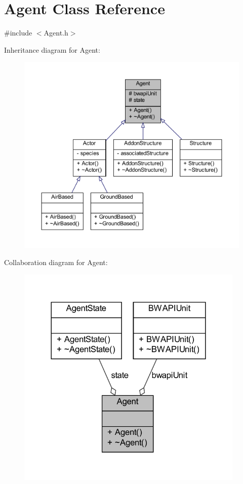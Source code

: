 \hypertarget{classAgent}{\section{Agent Class Reference}
\label{classAgent}
}


{\ttfamily \#include $<$Agent.\-h$>$}



Inheritance diagram for Agent\-:
\nopagebreak
\begin{figure}[H]
\begin{center}
\leavevmode
\includegraphics[width=350pt]{classAgent__inherit__graph}
\end{center}
\end{figure}


Collaboration diagram for Agent\-:
\nopagebreak
\begin{figure}[H]
\begin{center}
\leavevmode
\includegraphics[width=308pt]{classAgent__coll__graph}
\end{center}
\end{figure}

